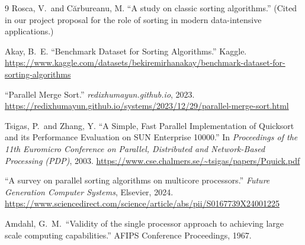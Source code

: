 \documentclass[letterpaper]{article}
\begin{document}
\begin{thebibliography}{9}
Rosca, V.\ and C\u{a}rbureanu, M.
``A study on classic sorting algorithms.''
(Cited in our project proposal for the role of sorting in modern data-intensive
applications.)

Akay, B.\ E.
``Benchmark Dataset for Sorting Algorithms.'' Kaggle.
\url{https://www.kaggle.com/datasets/bekiremirhanakay/benchmark-dataset-for-sorting-algorithms}

``Parallel Merge Sort.'' \emph{redixhumayun.github.io}, 2023.
\url{https://redixhumayun.github.io/systems/2023/12/29/parallel-merge-sort.html}

Tsigas, P.\ and Zhang, Y.
``A Simple, Fast Parallel Implementation of Quicksort and its Performance Evaluation on SUN Enterprise 10000.''
In \emph{Proceedings of the 11th Euromicro Conference on Parallel, Distributed and Network-Based Processing (PDP)}, 2003.
\url{https://www.cse.chalmers.se/~tsigas/papers/Pquick.pdf}

``A survey on parallel sorting algorithms on multicore processors.''
\emph{Future Generation Computer Systems}, Elsevier, 2024.
\url{https://www.sciencedirect.com/science/article/abs/pii/S0167739X24001225}

Amdahl, G.\ M.\ ``Validity of the single processor approach to achieving large scale
computing capabilities.'' AFIPS Conference Proceedings, 1967.

\end{thebibliography}
\end{document}
